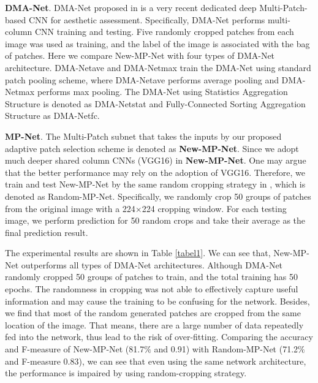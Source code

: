 \documentclass[10pt,twocolumn,letterpaper]{article}
\begin{document}
	\textbf{DMA-Net}. DMA-Net proposed in \cite{Lu:2015:ICCV} is a very recent dedicated deep Multi-Patch-based CNN for aesthetic assessment.
	Specifically, DMA-Net performs multi-column CNN training and testing. Five randomly cropped patches from each image was used as training, and the label of the image is associated with the bag of patches. Here we compare New-MP-Net with four types of DMA-Net architecture. DMA-Net{\tiny ave} and DMA-Net{\tiny max} train the DMA-Net using standard patch pooling scheme, where DMA-Net{\tiny ave} performs average pooling and DMA-Net{\tiny max} performs max pooling. The DMA-Net using Statistics Aggregation Structure is denoted as DMA-Net{\tiny stat} and Fully-Connected Sorting Aggregation Structure as DMA-Net{\tiny fc}. 
	
	\textbf{MP-Net}. The Multi-Patch subnet that takes the inputs by our proposed adaptive patch selection scheme is denoted as \textbf{New-MP-Net}. Since we adopt much deeper shared column CNNs (VGG16)  in \textbf{New-MP-Net}. One may argue that the better performance may rely on the adoption of VGG16. Therefore, we train and test New-MP-Net by the same random cropping strategy in \cite{Lu:2015:ICCV}, which is denoted as Random-MP-Net. Specifically, we randomly crop 50 groups of patches from the original image with a 224$\times$224 cropping window. For each testing image, we perform prediction for 50 random crops and take their average as the final prediction result. 
	
	The experimental results are shown in Table \ref{tabel1}. We can see that, New-MP-Net outperforms all types of DMA-Net architectures.
	Although DMA-Net randomly cropped 50 groups of patches to train, and the total training has 50 epochs. The randomness in cropping was not able to effectively capture useful information and may cause the training to be confusing for the network. Besides, we find that most of the random generated patches are cropped from the same location of the image. That means, there are a large number of data repeatedly fed into the network, thus lead to the risk of over-fitting. Comparing the accuracy and F-measure of New-MP-Net (81.7$\%$ and 0.91) with Random-MP-Net (71.2$\%$ and F-measure 0.83), we can see that even using the same network architecture, the performance is impaired by using random-cropping strategy.
	
\end{document}
